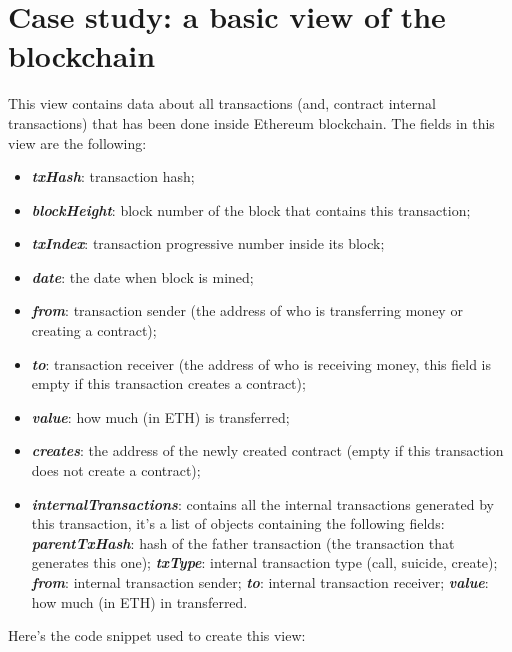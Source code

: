 \section{Case study: a basic view of the blockchain}
This view contains data about all transactions (and, contract internal transactions) that has been done inside Ethereum blockchain. The fields in this view are the following:
\begin{itemize}
    \item \textit{\textbf{txHash}}: transaction hash;
    \item \textit{\textbf{blockHeight}}: block number of the block that contains this transaction;
    \item \textit{\textbf{txIndex}}: transaction progressive number inside its block;
    \item \textit{\textbf{date}}: the date when block is mined;
    \item \textit{\textbf{from}}: transaction sender (the address of who is transferring money or creating a contract);
    \item \textit{\textbf{to}}: transaction receiver (the address of who is receiving money, this field is empty if this transaction creates a contract);
    \item \textit{\textbf{value}}: how much (in ETH) is transferred;
    \item \textit{\textbf{creates}}: the address of the newly created contract (empty if this transaction does not create a contract);
    \item \textit{\textbf{internalTransactions}}: contains all the internal transactions generated by this transaction, it's a list of objects containing the following fields:
        \subitem \textit{\textbf{parentTxHash}}: hash of the father transaction (the transaction that generates this one);
        \subitem \textit{\textbf{txType}}: internal transaction type (call, suicide, create);
        \subitem \textit{\textbf{from}}: internal transaction sender;
        \subitem \textit{\textbf{to}}: internal transaction receiver;
        \subitem \textit{\textbf{value}}: how much (in ETH) in transferred.
\end{itemize}
Here's the code snippet used to create this view:
